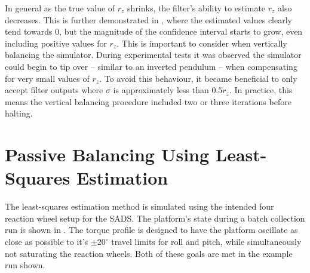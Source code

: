 In general as the true value of $r_z$ shrinks, the filter's ability to estimate $r_z$ also decreases. This is further demonstrated in , where the estimated values clearly tend towards 0, but the magnitude of the confidence interval starts to grow, even including positive values for $r_z$. This is important to consider when vertically balancing the simulator. During experimental tests it was observed the simulator could begin to tip over -- similar to an inverted pendulum -- when compensating for very small values of $r_z$. To avoid this behaviour, it became beneficial to only accept filter outputs where $\sigma$ is approximately less than $0.5r_z$. In practice, this means the vertical balancing procedure included two or three iterations before halting. 





\section{Passive Balancing Using Least-Squares Estimation}

The least-squares estimation method is simulated using the intended four reaction wheel setup for the SADS. The platform's state during a batch collection run is shown in . The torque profile is designed to have the platform oscillate as close as possible to it's $\pm20^{\circ}$ travel limits for roll and pitch, while simultaneously not saturating the reaction wheels. Both of these goals are met in the example run shown.

